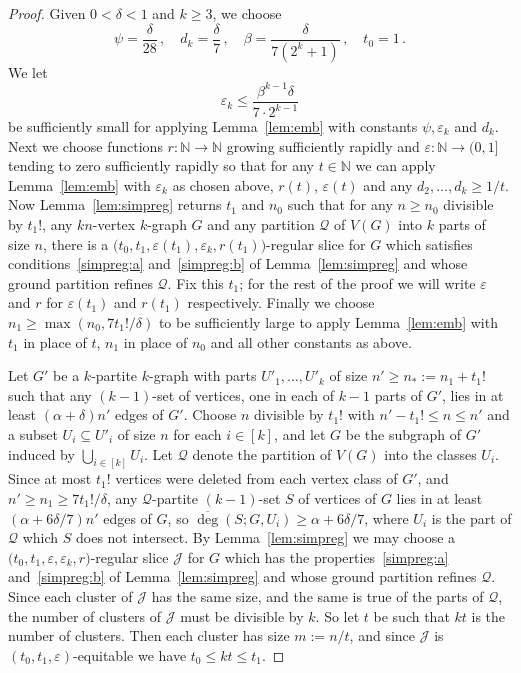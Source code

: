 \documentclass[12pt,a4paper]{amsart}
\let\eps\varepsilon
\newcommand{\NATS}{\mathbb{N}}
\newcommand{\cJ}{\mathcal{J}}
\newcommand{\Qart}{\mathcal{Q}}
\newcommand{\reldeg}{\overline{\deg}}
\begin{document}
\begin{proof}
  Given $0 < \delta < 1$ and $k \geq 3$, we choose \[\psi =
  \frac{\delta}{28}\,,\quad d_k =\frac{\delta}{7}\,,\quad
  \beta=\frac{\delta}{7(2^k+1)}\,,\quad t_0=1\,.\]
  We let \[\eps_k \leq \frac{\beta^{k-1}\delta}{7\cdot 2^{k-1}}\] be
sufficiently small for applying Lemma~\ref{lem:emb} with constants $\psi,
\eps_k$ and $d_k$. Next we choose functions $r: \NATS \to \NATS$ growing
sufficiently rapidly and $\eps: \NATS \to (0, 1]$ tending to zero sufficiently
rapidly so that for any $t \in \NATS$ we can apply Lemma~\ref{lem:emb}
with $\eps_k$ as chosen above, $r(t)$, $\eps(t)$ and any $d_2,
\dots, d_k \geq 1/t$. Now Lemma~\ref{lem:simpreg} returns $t_1$ and
$n_0$ such that for any $n\ge n_0$ divisible by $t_1!$, any $kn$-vertex
$k$-graph $G$ and any partition $\Qart$ of $V(G)$ into $k$ parts of size $n$, there is a
$\big(t_0,t_1,\eps(t_1),\eps_k,r(t_1)\big)$-regular slice for
$G$ which satisfies conditions~\ref{simpreg:a} and~\ref{simpreg:b} of
Lemma~\ref{lem:simpreg} and whose ground partition refines $\Qart$. Fix this
$t_1$; for the rest of the proof we will write $\eps$ and $r$ for
$\eps(t_1)$ and $r(t_1)$ respectively. Finally we choose $n_1 \geq \max
\left(n_0, 7t_1!/\delta\right)$ to be sufficiently large to apply
Lemma~\ref{lem:emb} with $t_1$ in place of $t$, $n_1$ in place of $n_0$ and all other constants as above.

Let $G'$ be a $k$-partite $k$-graph with parts $U'_1, \ldots, U'_k$ of size $n'\ge n_{*} :=
n_1 + t_1!$ such that any $(k-1)$-set of vertices, one in each of $k-1$
parts of $G'$, lies in at least $(\alpha+\delta)n'$ edges of $G'$. Choose $n$
divisible by $t_1!$ with $n'-t_1! \leq n \leq n'$ and a subset $U_i \subseteq
U'_i$ of size $n$ for each $i \in [k]$, and let $G$ be the subgraph of $G'$
induced by $\bigcup_{i \in [k]} U_i$. Let $\Qart$ denote the partition of
$V(G)$ into the classes $U_i$. Since at most $t_1!$ vertices were deleted
from each vertex class of $G'$, and $n' \geq n_1 \ge 7t_1!/\delta$, any
$\Qart$-partite $(k-1)$-set $S$ of vertices of $G$ lies in at least
$(\alpha+6\delta/7)n'$ edges of $G$, so $\reldeg(S;G, U_i)\ge\alpha+6\delta/7$,
where $U_i$ is the part of $\Qart$ which $S$ does not intersect. By
Lemma~\ref{lem:simpreg} we may choose a $\big(t_0,t_1,\eps,\eps_k,
r\big)$-regular slice $\cJ$ for $G$ which has the
properties~\ref{simpreg:a} and~\ref{simpreg:b} of Lemma~\ref{lem:simpreg} and
whose ground partition refines $\Qart$. Since each cluster of $\cJ$ has the
same size, and the same is true of the parts of $\Qart$, the number of clusters
of $\cJ$ must be divisible by $k$. So let $t$ be such that $kt$ is
the number of clusters. Then each cluster has size $m := n/t$, and since
$\cJ$ is $(t_0, t_1, \eps)$-equitable we have $t_0 \leq
kt \leq t_1$.


\end{proof}
\end{document}
